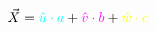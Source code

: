 \documentclass[preview]{standalone}
\begin{document}
$$\vec{X} = \textcolor[HTML]{00FFFF}{\hat{u}\cdot a} + \textcolor[HTML]{FF00FF}{\hat{v}\cdot b} + \textcolor[HTML]{FFFF00}{\hat{w}\cdot c}$$
\end{document}
